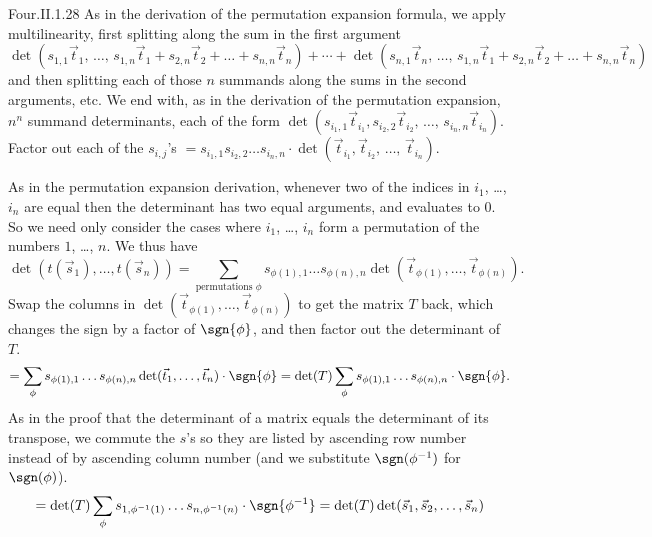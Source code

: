 \begin{ans}{Four.II.1.28}
     As in the derivation of the permutation expansion formula, we
     apply multilinearity,
     first splitting along the sum in the first argument
     \begin{equation*}
         \det(s_{1,1}\vec{t}_1,\,
            \dots,\,
            s_{1,n}\vec{t}_1+s_{2,n}\vec{t}_2+\dots+s_{n,n}\vec{t}_n)
        +\cdots{}
        +\det(s_{n,1}\vec{t}_n,\,
           \ldots,\,
            s_{1,n}\vec{t}_1+s_{2,n}\vec{t}_2+\dots+s_{n,n}\vec{t}_n)
     \end{equation*}
     and then splitting each of those $n$ summands along the sums
     in the second arguments, etc.
     We end with, as in the derivation of the permutation expansion,
     \( n^n \) summand determinants, each of the form
     $\det(s_{i_1,1}\vec{t}_{i_1},s_{i_2,2}\vec{t}_{i_2},
            \,\dots,\,
            s_{i_n,n}\vec{t}_{i_n})$.
     Factor out each of the $s_{i,j}$'s
     $=
       s_{i_1,1}s_{i_2,2}\dots s_{i_n,n}
        \cdot\det(\vec{t}_{i_1},\vec{t}_{i_2},
       \,\dots,\,
       \vec{t}_{i_n})
      $.

      As in the permutation expansion derivation,
      whenever two of the indices in $i_1$, \ldots, $i_n$ are equal
      then the determinant
      has two equal arguments, and evaluates to $0$.
      So we need only consider the cases where $i_1$, \ldots, $i_n$ form a
      permutation of the numbers $1$, \ldots, $n$.
      We thus have
      \begin{equation*}
        \det(t(\vec{s}_1),\dots,t(\vec{s}_n))=
          \sum_{\text{permutations\ } \phi}
            s_{\phi(1),1}\dots s_{\phi(n),n}
            \det(\vec{t}_{\phi(1)},\dots,\vec{t}_{\phi(n)}).
      \end{equation*}
      Swap the columns in $\det(\vec{t}_{\phi(1)},\ldots,\vec{t}_{\phi(n)})$
      to get the matrix \( T \) back, which changes the sign by a factor of
      $\sgn{\phi}$,
      and then factor out the determinant of $T$.
      \begin{equation*}
        =\sum_\phi
          s_{\phi(1),1}\dots s_{\phi(n),n}
            \det(\vec{t}_1,\dots,\vec{t}_n)\cdot\sgn{\phi}
        =\det(T)\sum_\phi
          s_{\phi(1),1}\dots s_{\phi(n),n}\cdot\sgn{\phi}.
      \end{equation*}
      As in the proof that the determinant of a matrix
      equals the determinant
      of its transpose, we commute the $s$'s so they are listed by ascending
      row number instead of by ascending column number
      (and we substitute $\sgn(\phi^{-1})$ for $\sgn(\phi)$).
      \begin{equation*}
        =\det(T)\sum_\phi
          s_{1,\phi^{-1}(1)}\dots s_{n,\phi^{-1}(n)}\cdot\sgn{\phi^{-1}}
        =\det(T)\det(\vec{s}_1,\vec{s}_2,\dots,\vec{s}_n)
      \end{equation*}
    
\end{ans}
